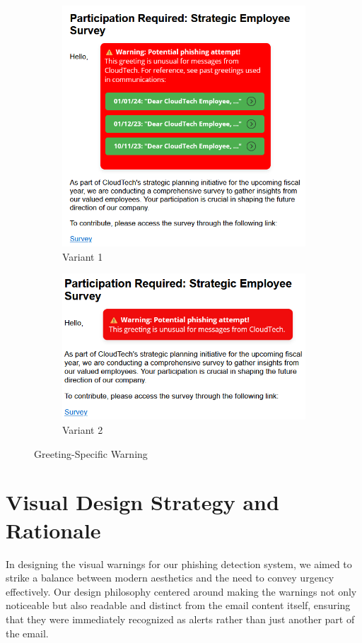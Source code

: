 \documentclass[
  a4paper,  %
  twoside,  %
  bibliography=totoc,
  headsepline,
  cleardoublepage=empty,
  parskip=half,
  draft=false
]{scrbook}
\begin{document}
\begin{figure} [h]
\centering
\begin{subfigure}{.5\textwidth}
  \centering
  \includegraphics[width=.9\linewidth]{study//conditions/greeting1.png}
  \caption{Variant 1}
  \label{fig:greeting1}
\end{subfigure}%
\begin{subfigure}{.5\textwidth}
  \centering
  \includegraphics[width=.9\linewidth]{study//conditions/greeting2.png}
  \caption{Variant 2}
  \label{fig:greeting2}
\end{subfigure}
\caption{Greeting-Specific Warning}
\label{fig:greeting}
\end{figure}

\section{Visual Design Strategy and Rationale}
In designing the visual warnings for our phishing detection system, we aimed to strike a balance between modern aesthetics and the need to convey urgency effectively. Our design philosophy centered around making the warnings not only noticeable but also readable and distinct from the email content itself, ensuring that they were immediately recognized as alerts rather than just another part of the email.
\end{document}

